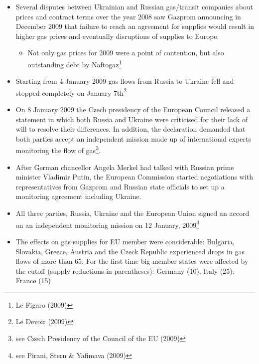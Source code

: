 \documentclass[11pt,a4paper,english]{scrreprt}
\begin{document}
\begin{itemize}

\item Several disputes between Ukrainian and Russian gas/transit companies
about prices and contract terms over the year 2008 saw Gazprom announcing in
December 2009 that failure to reach an agreement for supplies would result in
higher gas prices and eventually disruptions of supplies to Europe.

  \begin{itemize}
   \item Not only gas prices for 2009 were a point of contention, but also
outstanding debt by Naftogaz\footnote{Le Figaro (2009)}
  \end{itemize}

\item Starting from 4 January 2009 gas flows from Russia to Ukraine fell and
stopped completely on January 7th\footnote{Le Devoir (2009)}

\item On 8 January 2009 the Czech presidency of the European Council released a
statement in which both Russia and Ukraine were criticised for their lack of
will to resolve their differences. In addition, the declaration demanded that
both parties accept an independent mission made up of international experts
monitoring the flow of gas\footnote{see Czech Presidency of the Council of the
EU (2009)}.

\item After German chancellor Angela Merkel had talked with Russian prime
minister Vladimir Putin, the European Commission started negotiations with
representatives from Gazprom and Russian state officials to set up a monitoring
agreement including Ukraine.

\item All three parties, Russia, Ukraine and the European Union signed an
accord on an independent monitoring mission on 12 January,
2009\footnote{see Pirani, Stern \& Yafimava (2009)} 

\item The effects on gas supplies for EU member were considerable: Bulgaria,
Slovakia, Greece, Austria and the Czeck Republic experienced drops in gas flows
of more than 65\textdiscount{}. For the first time big member states were
affected by the cutoff (supply reductions in parentheses): Germany
(10\textdiscount{}), Italy (25\textdiscount{}), France (15\textdiscount{})

\end{itemize}
\end{document}
